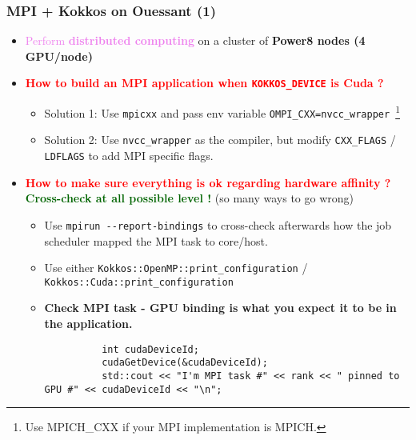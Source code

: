 \begin{frame}[fragile=singleslide]
  \frametitle{MPI + Kokkos on Ouessant (1)}

  \begin{itemize}
  \item \textcolor{violet}{Perform \textbf{distributed computing}} on a cluster of \textbf{Power8 nodes (4 GPU/node)}
  \item \textcolor{red}{\bf How to build an MPI application when \texttt{KOKKOS\_DEVICE} is Cuda ?}
    \begin{itemize}
    \item Solution 1: Use \texttt{mpicxx} and pass env variable \texttt{OMPI\_CXX=nvcc\_wrapper}~\footnote{Use MPICH\_CXX if your MPI implementation is MPICH.}
    \item Solution 2: Use \texttt{nvcc\_wrapper} as the compiler, but modify \texttt{CXX\_FLAGS} / \texttt{LDFLAGS} to add MPI specific flags.
    \end{itemize}
  \item \textcolor{red}{\bf How to make sure everything is ok regarding hardware affinity ? }
    \textcolor{darkgreen}{\textbf{Cross-check at all possible level !}} (so many ways to go wrong)
    \begin{itemize}
    \item Use \texttt{mpirun \--\--report-bindings} to cross-check afterwards how the job scheduler mapped the MPI task to core/host.
    \item Use either \texttt{Kokkos::OpenMP::print\_configuration} / \texttt{Kokkos::Cuda::print\_configuration}
    \item {\bf Check MPI task - GPU binding is what you expect it to be in the application.}
      {\scriptsize
        \begin{verbatim}
          int cudaDeviceId;
          cudaGetDevice(&cudaDeviceId);
          std::cout << "I'm MPI task #" << rank << " pinned to GPU #" << cudaDeviceId << "\n";
        \end{verbatim}
      }
    \end{itemize} 
  \end{itemize}

\end{frame}

